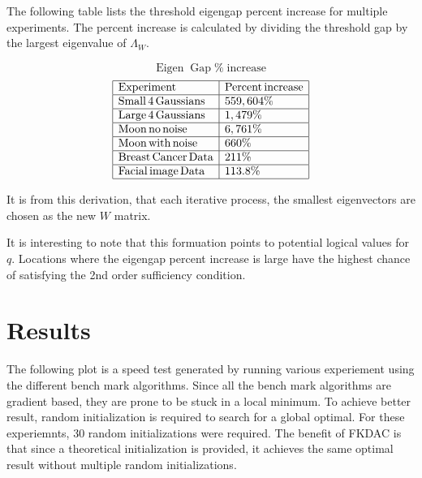 \documentclass{article}
\newcommand{\tmop}[1]{\ensuremath{\operatorname{#1}}}
\begin{document}
The following table lists the threshold eigengap percent increase for multiple
experiments. The percent increase is calculated by dividing the threshold gap
by the largest eigenvalue of $\Lambda_W$.


\[ \tmop{Eigen} \tmop{Gap} \% \tmop{increase} \]
\[ \begin{array}{|l|l|}
     \hline
     \tmop{Experiment} & \tmop{Percent} \tmop{increase}\\
     \hline
     \tmop{Small} 4 \tmop{Gaussians} & 559, 604\%\\
     \hline
     \tmop{Large} 4 \tmop{Gaussians} & 1, 479\%\\
     \hline
     \tmop{Moon} \tmop{no} \tmop{noise} & 6, 761\%\\
     \hline
     \tmop{Moon} \tmop{with} \tmop{noise} & 660\%\\
     \hline
     \tmop{Breast} \tmop{Cancer} \tmop{Data} & 211\%\\
     \hline
     \tmop{Facial} \tmop{image} \tmop{Data} & 113.8\%\\
     \hline
   \end{array} \]






It is from this derivation, that each iterative process, the smallest
eigenvectors are chosen as the new $W$ matrix.



It is interesting to note that this formuation points to potential logical
values for $q$. Locations where the eigengap percent increase is large have
the highest chance of satisfying the 2nd order sufficiency condition.



\section{Results}



The following plot is a speed test generated by running various experiement
using the different bench mark algorithms. Since all the bench mark algorithms
are gradient based, they are prone to be stuck in a local minimum. To achieve
better result, random initialization is required to search for a global
optimal. For these experiemnts, 30 random initializations were required. The
benefit of FKDAC is that since a theoretical initialization is provided, it
achieves the same optimal result without multiple random initializations.
\end{document}
